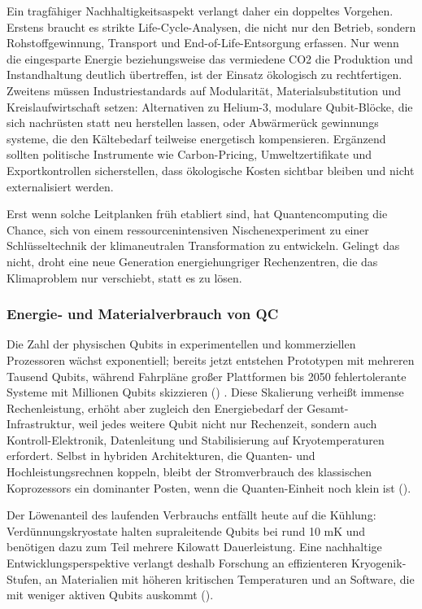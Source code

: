 Ein tragfähiger Nachhaltigkeitsaspekt verlangt daher ein doppeltes Vorgehen. Erstens braucht es strikte Life-Cycle-Analysen, die nicht nur den Betrieb, sondern Rohstoffgewinnung, Transport und End-of-Life-Entsorgung erfassen. Nur wenn die eingesparte Energie beziehungsweise das vermiedene CO2 die Produktion und Instandhaltung deutlich übertreffen, ist der Einsatz ökologisch zu rechtfertigen. Zweitens müssen Industriestandards auf Modularität, Materialsubstitution und Kreislaufwirtschaft setzen: Alternativen zu Helium-3, modulare Qubit-Blöcke, die sich nachrüsten statt neu herstellen lassen, oder Abwärmerück gewinnungs systeme, die den Kältebedarf teilweise energetisch kompensieren. Ergänzend sollten politische Instrumente wie Carbon-Pricing, Umweltzertifikate und Exportkontrollen sicherstellen, dass ökologische Kosten sichtbar bleiben und nicht externalisiert werden. \cite{rootQuantumTechnologiesContext2025}

Erst wenn solche Leitplanken früh etabliert sind, hat Quantencomputing die Chance, sich von einem ressourcenintensiven Nischenexperiment zu einer Schlüsseltechnik der klimaneutralen Transformation zu entwickeln. Gelingt das nicht, droht eine neue Generation energiehungriger Rechenzentren, die das Klimaproblem nur verschiebt, statt es zu lösen.

\subsubsection{Energie‑ und Materialverbrauch von QC}
Die Zahl der physischen Qubits in experimentellen und kommerziellen Prozessoren wächst exponentiell; bereits jetzt entstehen Prototypen mit mehreren Tausend Qubits, während Fahrpläne großer Plattformen bis 2050 fehlertolerante Systeme mit Millionen Qubits skizzieren (\cite{schwabeOpportunitiesChallengesQuantum2025a}) . Diese Skalierung verheißt immense Rechenleistung, erhöht aber zugleich den Energiebedarf der Gesamt-Infrastruktur, weil jedes weitere Qubit nicht nur Rechenzeit, sondern auch Kontroll-Elektronik, Datenleitung und Stabilisierung auf Kryotemperaturen erfordert. Selbst in hybriden Architekturen, die Quanten- und Hochleistungsrechnen koppeln, bleibt der Stromverbrauch des klassischen Koprozessors ein dominanter Posten, wenn die Quanten-Einheit noch klein ist (\cite{schwabeOpportunitiesChallengesQuantum2025a}).

Der Löwenanteil des laufenden Verbrauchs entfällt heute auf die Kühlung: Verdünnungskryostate halten supraleitende Qubits bei rund 10 mK und benötigen dazu zum Teil mehrere Kilowatt Dauerleistung. Eine nachhaltige Entwicklungsperspektive verlangt deshalb Forschung an effizienteren Kryogenik-Stufen, an Materialien mit höheren kritischen Temperaturen und an Software, die mit weniger aktiven Qubits auskommt (\cite{rootQuantumTechnologiesContext2025}).

